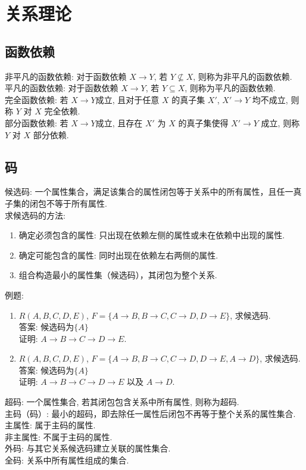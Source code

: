 \section{关系理论}
\subsection{函数依赖}
\noindent 非平凡的函数依赖: 对于函数依赖 $X \rightarrow Y$, 若 $Y \not\subseteq X$, 则称为非平凡的函数依赖.\\
平凡的函数依赖: 对于函数依赖 $X \rightarrow Y$, 若 $Y \subseteq X$, 则称为平凡的函数依赖.\\
完全函数依赖: 若 $X \rightarrow Y$成立, 且对于任意 $X$ 的真子集 $X'$, $X' \rightarrow Y$ 均不成立, 则称 $Y$ 对 $X$ 完全依赖.\\
部分函数依赖: 若 $X \rightarrow Y$成立, 且存在 $X'$ 为 $X$ 的真子集使得 $X' \rightarrow Y$ 成立, 则称 $Y$ 对 $X$ 部分依赖.\\

\subsection{码}
候选码: 一个属性集合，满足该集合的属性闭包等于关系中的所有属性，且任一真子集的闭包不等于所有属性.\\
求候选码的方法:
\begin{enumerate}
    \item 确定必须包含的属性: 只出现在依赖左侧的属性或未在依赖中出现的属性.
    \item 确定可能包含的属性: 同时出现在依赖左右两侧的属性.
    \item 组合构造最小的属性集（候选码），其闭包为整个关系.
\end{enumerate}
例题:
\begin{enumerate}
    \item $R(A, B, C, D, E)$, $F = \{A \rightarrow B, B \rightarrow C, C \rightarrow D, D \rightarrow E\}$, 求候选码.\\
    答案: 候选码为$\{A\}$\\
    证明: $A \rightarrow B \rightarrow C \rightarrow D \rightarrow E$.
    \item $R(A, B, C, D, E)$, $F = \{A \rightarrow B, B \rightarrow C, C \rightarrow D, D \rightarrow E, A \rightarrow D\}$, 求候选码.\\
    答案: 候选码为$\{A\}$\\
    证明: $A \rightarrow B \rightarrow C \rightarrow D \rightarrow E$ 以及 $A \rightarrow D$.
\end{enumerate}
超码: 一个属性集合, 若其闭包包含关系中所有属性, 则称为超码.\\
主码（码）: 最小的超码，即去除任一属性后闭包不再等于整个关系的属性集合.\\
主属性: 属于主码的属性.\\
非主属性: 不属于主码的属性.\\
外码: 与其它关系候选码建立关联的属性集合.\\
全码: 关系中所有属性组成的集合.\\
